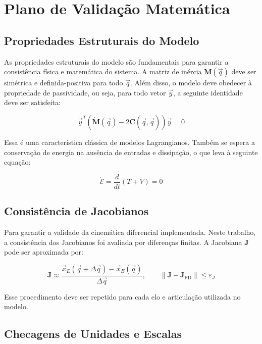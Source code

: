 \section{Plano de Validação Matemática}

\subsection{Propriedades Estruturais do Modelo}

As propriedades estruturais do modelo são fundamentais para garantir a consistência física e matemática do sistema. A matriz de inércia $ \mathbf{M}(\vec{q}) $ deve ser simétrica e definida-positiva para todo $ \vec{q} $. Além disso, o modelo deve obedecer à propriedade de passividade, ou seja, para todo vetor $ \vec{y} $, a seguinte identidade deve ser satisfeita:

\begin{equation}
\vec{y}^T \left( \dot{\mathbf{M}}(\vec{q}) - 2\mathbf{C}(\vec{q}, \dot{\vec{q}}) \right) \vec{y} = 0
\label{eq:passividade}
\end{equation}

Essa é uma característica clássica de modelos Lagrangianos. Também se espera a conservação de energia na ausência de entradas e dissipação, o que leva à seguinte equação:

\begin{equation}
\dot{\mathcal{E}} = \frac{d}{dt}(T + V) = 0
\label{eq:conservacao_energia}
\end{equation}

\subsection{Consistência de Jacobianos}

Para garantir a validade da cinemática diferencial implementada.
Neste trabalho, a consistência dos Jacobianos foi avaliada por diferenças finitas.
A Jacobiana $ \mathbf{J} $ pode ser aproximada por:

\begin{equation}
\mathbf{J} \approx \frac{\vec{x}_E(\vec{q} + \Delta \vec{q}) - \vec{x}_E(\vec{q})}{\Delta \vec{q}}, \qquad \left\| \mathbf{J} - \mathbf{J}_{\mathrm{FD}} \right\| \leq \varepsilon_J
\label{eq:jacobiano_finitas}
\end{equation}

Esse procedimento deve ser repetido para cada elo e articulação utilizada no modelo.

\subsection{Checagens de Unidades e Escalas}

